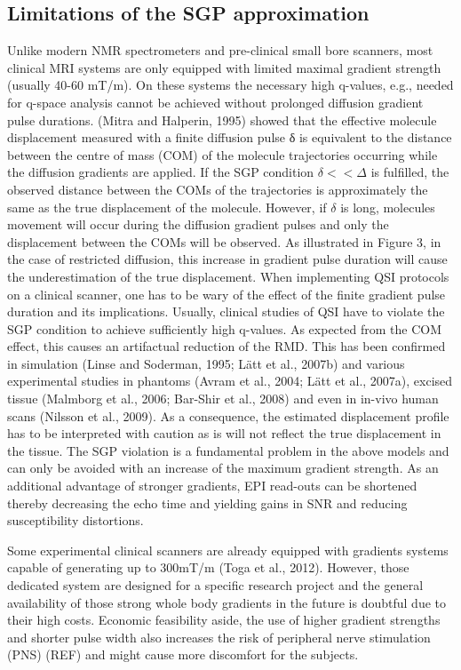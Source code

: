 \subsection{Limitations of the SGP approximation}
Unlike modern NMR spectrometers and pre-clinical small bore scanners, most clinical MRI systems are only equipped with limited maximal gradient strength (usually 40-60 mT/m). On these systems the necessary high q-values, e.g., needed for q-space analysis cannot be achieved without prolonged diffusion gradient pulse durations. (Mitra and Halperin, 1995) showed that the effective molecule displacement measured with a finite diffusion pulse δ is equivalent to the distance between the centre of mass (COM) of the molecule trajectories occurring while the diffusion gradients are applied. If the SGP condition $ \delta << \Delta$ is fulfilled, the observed distance between the COMs of the trajectories is approximately the same as the true displacement of the molecule. However, if $\delta$ is long, molecules movement will occur during the diffusion gradient pulses and only the displacement between the COMs will be observed. As illustrated in Figure 3, in the case of restricted diffusion, this increase in gradient pulse duration will cause the underestimation of the true displacement. 
When implementing QSI protocols on a clinical scanner, one has to be wary of the effect of the finite gradient pulse duration and its implications. Usually, clinical studies of QSI have to violate the SGP condition to achieve sufficiently high q-values. As expected from the COM effect, this causes an artifactual reduction of the RMD. This has been confirmed in simulation (Linse and Soderman, 1995; Lätt et al., 2007b) and various experimental studies in phantoms (Avram et al., 2004; Lätt et al., 2007a), excised tissue (Malmborg et al., 2006; Bar-Shir et al., 2008)   and even in in-vivo human scans (Nilsson et al., 2009). As a consequence, the estimated displacement profile has to be interpreted with caution as is will not reflect the true displacement in the tissue. The SGP violation is a fundamental problem in the above models and can only be avoided with an increase of the maximum gradient strength. As an additional advantage of stronger gradients, EPI read-outs can be shortened thereby decreasing the echo time and yielding gains in SNR and reducing susceptibility distortions.

Some experimental clinical scanners are already equipped with gradients systems capable of generating up to 300mT/m (Toga et al., 2012). However, those dedicated system are designed for a specific research project and the general availability of those strong whole body gradients in the future is doubtful due to their high costs. Economic feasibility aside, the use of higher gradient strengths and shorter pulse width also increases the risk of peripheral nerve stimulation (PNS) (REF) and might cause more discomfort for the subjects. 

